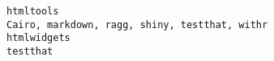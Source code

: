 \documentclass[
  letterpaper,
  DIV=11,
  numbers=noendperiod]{scrreprt}
\begin{document}
\begin{verbatim}
htmltools                                                                                                                                                                                                                                                                                                                                                                                                                                                                                                                                                                                                                                                                                                                                                                                                                                                                                                                                                                                                                                                                                                                                                                                                                                                       Cairo, markdown, ragg, shiny, testthat, withr
htmlwidgets                                                                                                                                                                                                                                                                                                                                                                                                                                                                                                                                                                                                                                                                                                                                                                                                                                                                                                                                                                                                                                                                                                                                                                                                                                                                                          testthat

\end{verbatim}
\end{document}
